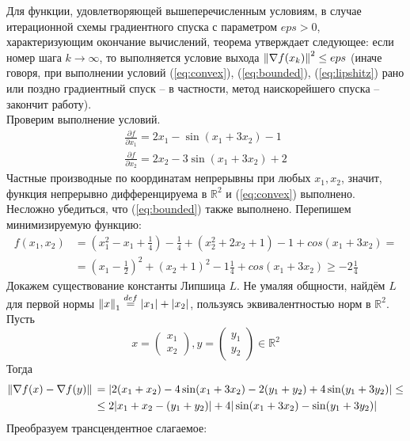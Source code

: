 \documentclass[main.tex]{subfiles}
\begin{document}
Для функции, удовлетворяющей вышеперечисленным условиям, в случае итерационной схемы градиентного спуска с параметром $eps > 0$, характеризующим окончание вычислений, теорема утверждает следующее: 
если номер шага $k\rightarrow \infty$, то выполняется условие выхода $\left\lVert\nabla f(x_k)\right\rVert^2 \le eps$  (иначе говоря, при выполнении условий (\ref{eq:convex}), (\ref{eq:bounded}), (\ref{eq:lipshitz}) рано или поздно градиентный спуск -- в частности, метод наискорейшего спуска -- закончит работу).\\
Проверим выполнение условий.\\
\begin{gather*}
\frac{\partial f}{\partial x_1} = 2x_1 - \sin(x_1+3x_2)-1\\
\frac{\partial f}{\partial x_2} = 2x_2 - 3\sin(x_1+3x_2)+2
\end{gather*}
Частные производные по координатам непрерывны при любых $x_1, x_2$, значит, функция непрерывно дифференцируема в $\mathds{R}^2$ и (\ref{eq:convex}) выполнено.\\
Несложно убедиться, что (\ref{eq:bounded}) также выполнено. Перепишем минимизируемую функцию:
\begin{equation*}
\begin{aligned} %
f(x_1, x_2) {}& = (x_1^2-x_1+\frac{1}{4})-\frac{1}{4}+(x_2^2+2x_2+1)-1 + cos(x_1+3x_2) = \\
 & = (x_1-\frac{1}{2})^2+(x_2+1)^2-1\frac{1}{4}+cos(x_1+3x_2)\ge -2\frac{1}{4}
\end{aligned}
\end{equation*}
Докажем существование константы Липшица $L$. Не умаляя общности, найдём $L$ для первой нормы $\left\lVert x\right\rVert_1\overset{def}{=}|x_1|+|x_2|$, пользуясь эквивалентностью норм в $\mathds{R}^2$. Пусть
\begin{equation*}
x=\begin{pmatrix}x_1\\x_2\end{pmatrix}, y=\begin{pmatrix}y_1\\y_2\end{pmatrix} \in \mathds{R}^2 
\end{equation*}
Тогда
\begin{equation*}
\begin{aligned}
\left\lVert\nabla f(x) - \nabla f(y)\right\rVert {}& = |2(x_1+x_2)-4\sin(x_1+3x_2) -2(y_1+y_2)+4\sin(y_1+3y_2)| \le \\
& \le 2|x_1+x_2-(y_1+y_2)|+4|\sin(x_1+3x_2)-\sin(y_1+3y_2)|  
\end{aligned}
\end{equation*}
Преобразуем трансцендентное слагаемое:
\end{document}
